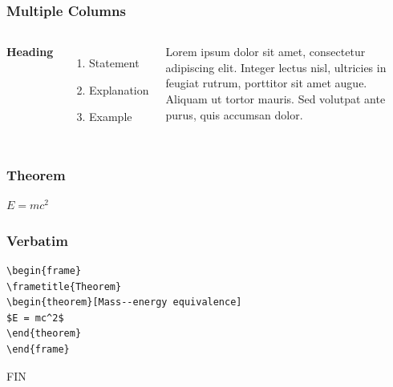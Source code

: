 \documentclass[12pt]{beamer}\usepackage[]{graphicx}\usepackage[]{color}
\begin{document}
\begin{frame}
\frametitle{Multiple Columns}
\begin{columns}[c] %

\textbf{Heading}
\begin{enumerate}
\item Statement
\item Explanation
\item Example
\end{enumerate}

Lorem ipsum dolor sit amet, consectetur adipiscing elit. Integer lectus nisl, ultricies in feugiat rutrum, porttitor sit amet augue. Aliquam ut tortor mauris. Sed volutpat ante purus, quis accumsan dolor.

\end{columns}
\end{frame}


\begin{frame}
\frametitle{Theorem}
\begin{theorem}
$E = mc^2$
\end{theorem}
\end{frame}

\begin{frame}[fragile] %
\frametitle{Verbatim}
\begin{example}
\begin{verbatim}
\begin{frame}
\frametitle{Theorem}
\begin{theorem}[Mass--energy equivalence]
$E = mc^2$
\end{theorem}
\end{frame}\end{verbatim}
\end{example}
\end{frame}

\begin{frame}
\Huge{\centerline{FIN}}
\end{frame}

\end{document}
